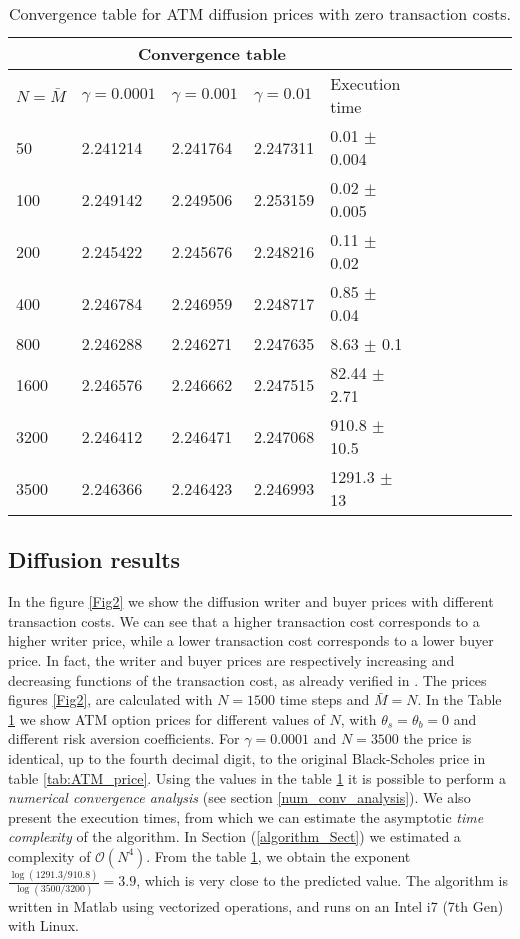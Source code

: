 \begin{table}[ht]
\centering
 \begin{tabular}{*{11}l}
 \toprule
  \multicolumn{5}{c}{\textbf{Convergence table}} \\
  \midrule
  $N = \bar M$ & $\gamma = 0.0001$ & $\gamma = 0.001$ & $\gamma = 0.01$ & Execution time \\
  \midrule
    50   & 2.241214 & 2.241764 & 2.247311 & 0.01 $\pm$ 0.004\\
    100  & 2.249142 & 2.249506 & 2.253159 & 0.02 $\pm$ 0.005\\
    200  & 2.245422 & 2.245676 & 2.248216 & 0.11 $\pm$ 0.02\\
    400  & 2.246784 & 2.246959 & 2.248717 & 0.85 $\pm$ 0.04 \\
    800  & 2.246288 & 2.246271 & 2.247635 & 8.63 $\pm$ 0.1 \\
    1600 & 2.246576 & 2.246662 & 2.247515 & 82.44 $\pm$ 2.71\\
    3200 & 2.246412 & 2.246471 & 2.247068 & 910.8 $\pm$ 10.5\\
    3500 & 2.246366 & 2.246423 & 2.246993 & 1291.3 $\pm$ 13\\
  \bottomrule
  \end{tabular}
  \caption{Convergence table for ATM diffusion prices with zero transaction costs.}
  \label{tab:convergence}
\end{table}

\subsection{Diffusion results}

In the figure \ref{Fig2} we show the diffusion writer and buyer prices with different
transaction costs.  
We can see that a higher transaction cost corresponds to a higher writer price, while a lower transaction cost corresponds to a lower buyer price.
In fact, the writer and buyer prices are respectively increasing and decreasing functions of the transaction cost, as already verified in \cite{ClHo97}.
The prices figures \ref{Fig2}, are calculated with $N=1500$ time steps and $\bar M = N$. 
In the Table \ref{tab:convergence} we show ATM option prices for different values of $N$, with $\theta_s = \theta_b = 0$ and different risk aversion coefficients.
For $\gamma=0.0001$ and $N=3500$ the price is identical, up to the fourth decimal digit, to the original Black-Scholes price in table \ref{tab:ATM_price}. 
Using the values in the table \ref{tab:convergence} it is possible to perform a \emph{numerical convergence analysis} (see section \ref{num_conv_analysis}).
We also present the execution times, from which we can estimate the asymptotic \emph{time complexity} of the algorithm. 
In Section (\ref{algorithm_Sect}) we estimated a complexity of $\mathcal{O}(N^{4})$. From the table \ref{tab:convergence}, 
we obtain the exponent $\frac{\log(1291.3/910.8)}{\log(3500/3200)} = 3.9$, which is very close to the predicted value.  
The algorithm is written in Matlab using vectorized operations, and runs on an Intel i7 (7th Gen) with Linux.

